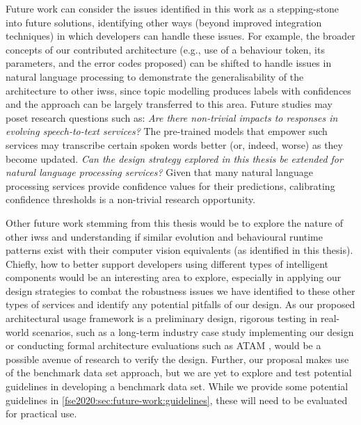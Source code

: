 Future work can consider the issues identified in this work as a stepping-stone into future solutions, identifying other ways (beyond improved integration techniques) in which developers can handle these issues. For example, the broader concepts of our contributed architecture (e.g., use of a behaviour token, its parameters, and the error codes proposed) can be shifted to handle issues in natural language processing to demonstrate the generalisability of the architecture to other \glspl{iws}, since topic modelling produces labels with confidences and the approach can be largely transferred to this area. Future studies may poset research questions such as: \textit{Are there non-trivial impacts to responses in evolving speech-to-text services?} The pre-trained models that empower such services may transcribe certain spoken words better (or, indeed, worse) as they become updated. \textit{Can the design strategy explored in this thesis be extended for natural language processing services?} Given that many natural language processing services provide confidence values for their predictions, calibrating confidence thresholds is a non-trivial research opportunity.

Other future work stemming from this thesis would be to explore the nature of other \glspl{iws} and understanding if similar evolution and behavioural runtime patterns exist with their computer vision equivalents (as identified in this thesis). Chiefly, how to better support developers using different types of intelligent components would be an interesting area to explore, especially in applying our design strategies to combat the robustness issues we have identified to these other types of services and identify any potential pitfalls of our design. As our proposed architectural usage framework is a preliminary design, rigorous testing in real-world scenarios, such as a long-term industry case study implementing our design or conducting formal architecture evaluations such as ATAM \citep{Kazman2000}, would be a possible avenue of research to verify the design. Further, our proposal makes use of the benchmark data set approach, but we are yet to explore and test potential guidelines in developing a benchmark data set. While we provide some potential guidelines in \cref{fse2020:sec:future-work:guidelines}, these will need to be evaluated for practical use.

